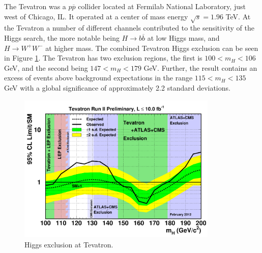 The Tevatron was a $p\overline{p}$ collider located at Fermilab National Laboratory, just west of Chicago, IL. 
It operated at a center of mass energy $\sqrt{s} = 1.96$ TeV.
At the Tevatron a number of different channels contributed to the sensitivity of the Higgs search, the more notable being $H \rightarrow b\overline{b}$ at low Higgs mass, and $H \rightarrow W^{+}W^{-}$ at higher mass\cite{TEVHIGGS}.
The combined Tevatron Higgs exclusion can be seen in Figure \ref{fig:tevexclusion}.
The Tevatron has two exclusion regions, the first is $100 < m_{H} < 106$ GeV, and the second being $147 < m_{H} < 179$ GeV.
Further, the result contains an excess of events above background expectations in the range $115 < m_{H} < 135$ GeV with a global significance of approximately 2.2 standard deviations.
\begin{figure}[htpb]
\centerline{\includegraphics[width=0.85\textwidth]{plots/tev28febsmbayeslimits.pdf}}
\caption{Higgs exclusion at Tevatron\cite{TEVHIGGS}.}
\label{fig:tevexclusion}
\end{figure}

